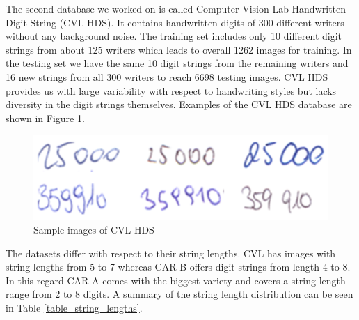 The second database we worked on is called Computer Vision Lab Handwritten Digit String (CVL HDS). It contains handwritten digits of 300 different writers without any background noise. The training set includes only 10 different digit strings from about 125 writers which leads to overall 1262 images for training. In the testing set we have the same 10 digit strings from the remaining writers and 16 new strings from all 300 writers to reach 6698 testing images. CVL HDS provides us with large variability with respect to handwriting styles but lacks diversity in the digit strings themselves. Examples of the CVL HDS database are shown in Figure \ref{fig:cvl}.

\begin{figure}
  \includegraphics[width=\linewidth]{images/CVL-HDS-Splitted.png}
  \caption{Sample images of CVL HDS}
  \label{fig:cvl}
\end{figure}

The datasets differ with respect to their string lengths. CVL has images with string lengths from 5 to 7 whereas CAR-B offers digit strings from length 4 to 8. In this regard CAR-A comes with the biggest variety and covers a string length range from 2 to 8 digits. A summary of the string length distribution can be seen in Table \ref{table_string_lengths}.

\begin{table}
\caption{\label{table_string_lengths} {\it Summary of string length distribution.}}
\vspace{2mm}
\hspace{1mm}
\end{table}

